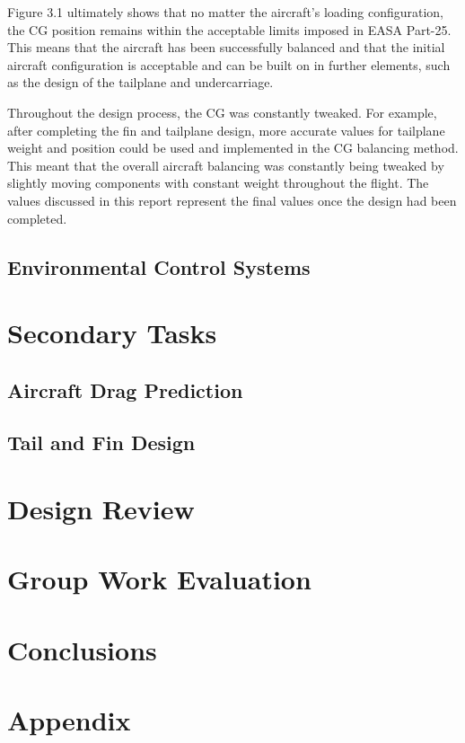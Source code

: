 \documentclass[stu, a4paper, 12pt, floatsintext]{apa7}
\numberwithin{figure}{section}
\numberwithin{table}{section}
\numberwithin{equation}{section}
\begin{document}
Figure 3.1 ultimately shows that no matter the aircraft's loading configuration, the CG position remains within the acceptable limits imposed in EASA Part-25. This means that the aircraft has been successfully balanced and that the initial aircraft configuration is acceptable and can be built on in further elements, such as the design of the tailplane and undercarriage. 

Throughout the design process, the CG was constantly tweaked. For example, after completing the fin and tailplane design, more accurate values for tailplane weight and position could be used and implemented in the CG balancing method. This meant that the overall aircraft balancing was constantly being tweaked by slightly moving components with constant weight throughout the flight. The values discussed in this report represent the final values once the design had been completed.  

\subsection{Environmental Control Systems}
\section{Secondary Tasks}
\subsection{Aircraft Drag Prediction}
\subsection{Tail and Fin Design}
\section{Design Review}
\section{Group Work Evaluation}
\section{Conclusions}

\section{Appendix}

\printbibliography
\end{document}
